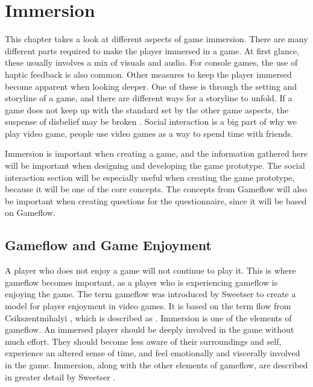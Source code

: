 \chapter{Immersion}
\label{ch:immersion}

This chapter takes a look at different aspects of game immersion. There are many different parts required to make the player immersed in a game.
At first glance, these usually involves a mix of visuals and audio.
For console games, the use of haptic feedback is also common.
Other measures to keep the player immersed become apparent when looking deeper.
One of these is through the setting and storyline of a game, and there are different ways for a storyline to unfold.
If a game does not keep up with the standard set by the other game aspects, the suspense of disbelief may be broken \cite{overmars2012}. Social interaction is a big part of why we play video game, people use video games as a way to spend time with friends.

Immersion is important when creating a game, and the information gathered here will be important when designing and developing the game prototype. The social interaction  section will be especially useful when creating the game prototype, because it will be one of the core concepts. The concepts from Gameflow will also be important when creating questions for the questionnaire, since it will be based on Gameflow.


\section{Gameflow and Game Enjoyment}
\label{immersionGameflow}
A player who does not enjoy a game will not continue to play it.
This is where gameflow becomes important, as a player who is experiencing gameflow is enjoying the game.
The term gameflow was introduced by Sweetser \cite{sweetser2005gameflow} to create a model for player enjoyment in video games.
It is based on the term flow from Csikszentmihalyi \cite{csikszentmihalyi1991flow}, which is described as .
Immersion is one of the elements of gameflow.
An immersed player should be deeply involved in the game without much effort.
They should become less aware of their surroundings and self, experience an altered sense of time, and feel emotionally and viscerally involved in the game.
Immersion, along with the other elements of gameflow, are described in greater detail by Sweetser \cite{sweetser2005gameflow}.

